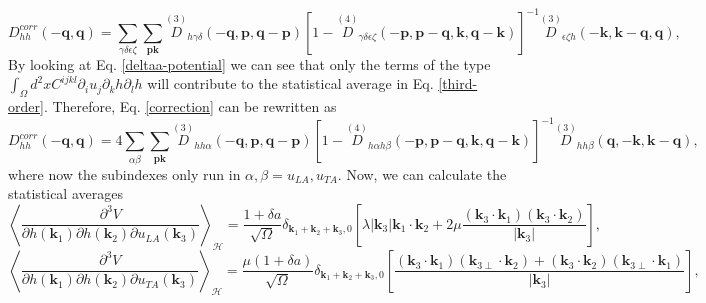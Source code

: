 \begin{equation}
 D_{hh}^{corr}(-\boldsymbol{q},\boldsymbol{q})=\sum_{\gamma\delta\epsilon\zeta}\sum_{\boldsymbol{p}\boldsymbol{k}}\overset{(3)}{D}{}_{h\gamma\delta}(-\boldsymbol{q},\boldsymbol{p},
 \boldsymbol{q}-\boldsymbol{p})[1-\overset{(4)}{D}{}_{\gamma\delta\epsilon\zeta}(-\boldsymbol{p},\boldsymbol{p}-\boldsymbol{q},\boldsymbol{k},\boldsymbol{q}-\boldsymbol{k})]^{-1}\overset{(3)}{D}{}_{
 \epsilon\zeta h}(-\boldsymbol{k},\boldsymbol{k}-\boldsymbol{q},\boldsymbol{q}),
\end{equation}
By looking at Eq. \ref{deltaa-potential} we can see that only the terms of the type $\int_{\Omega}{d^{2}xC^{ijkl}\partial_{i}u_{j}\partial_{k}h\partial_{l}h}$ will contribute to the statistical average in
Eq. \ref{third-order}. Therefore, Eq. \ref{correction} can be rewritten as
\begin{equation}
\label{correction-simple}
 D_{hh}^{corr}(-\boldsymbol{q},\boldsymbol{q})=4\sum_{\alpha\beta}\sum_{\boldsymbol{p}\boldsymbol{k}}\overset{(3)}{D}{}_{hh\alpha}(-\boldsymbol{q},\boldsymbol{p},\boldsymbol{q}-\boldsymbol{p})[
 1-\overset{(4)}{D}{}_{h\alpha h\beta}(-\boldsymbol{p},\boldsymbol{p}-\boldsymbol{q},\boldsymbol{k},\boldsymbol{q}-\boldsymbol{k})]^{-1}\overset{(3)}{D}{}_{hh\beta}(\boldsymbol{q},-\boldsymbol{k},\boldsymbol{k}-\boldsymbol{q}),
\end{equation}
where now the subindexes only run in $\alpha,\beta=u_{LA},u_{TA}$. Now, we can calculate the statistical averages
\begin{equation}
 \left\langle\frac{\partial^{3}V}{\partial h(\boldsymbol{k}_{1})\partial h(\boldsymbol{k}_{2})\partial u_{LA}(\boldsymbol{k}_{3})}\right\rangle_{\mathcal{H}}=\frac{1+\delta a}{\sqrt{\Omega}}\delta_{\boldsymbol{k}_{1}+\boldsymbol{
 k}_{2}+\boldsymbol{k}_{3},0}\left[\lambda|\boldsymbol{k}_{3}|\boldsymbol{k}_{1}\cdot\boldsymbol{k}_{2}+2\mu\frac{(\boldsymbol{k}_{3}\cdot\boldsymbol{k}_{1})(\boldsymbol{k}_{3}\cdot\boldsymbol{k}_{2})}{|\boldsymbol{k}_{3}|}\right],
\end{equation}
\begin{equation}
 \left\langle\frac{\partial^{3}V}{\partial h(\boldsymbol{k}_{1})\partial h(\boldsymbol{k}_{2})\partial u_{TA}(\boldsymbol{k}_{3})}\right\rangle_{\mathcal{H}}=\frac{\mu(1+\delta a)}{\sqrt{\Omega}}\delta_{\boldsymbol{k}_{
 1}+\boldsymbol{k}_{2}+\boldsymbol{k}_{3},0}\left[\frac{(\boldsymbol{k}_{3}\cdot\boldsymbol{k}_{1})(\boldsymbol{k}_{3\perp}\cdot\boldsymbol{k}_{2})+(\boldsymbol{k}_{3}\cdot\boldsymbol{k}_{2})(\boldsymbol{k}_{3\perp}\cdot
 \boldsymbol{k}_{1})}{|\boldsymbol{k}_{3}|}\right],
\end{equation}
